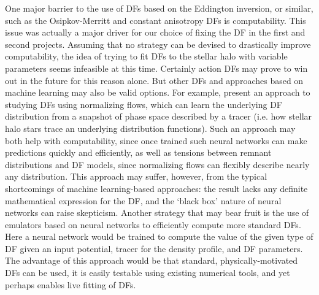 One major barrier to the use of DFs based on the Eddington inversion, or similar, such as the Osipkov-Merritt and constant anisotropy DFs is computability. This issue was actually a major driver for our choice of fixing the DF in the first and second projects. Assuming that no strategy can be devised to drastically improve computability, the idea of trying to fit DFs to the stellar halo with variable parameters seems infeasible at this time. Certainly action DFs may prove to win out in the future for this reason alone. But other DFs and approaches based on machine learning may also be valid options. For example, \textcite{green23} present an approach to studying DFs using normalizing flows, which can learn the underlying DF distribution from a snapshot of phase space described by a tracer (i.e. how stellar halo stars trace an underlying distribution functions). Such an approach may both help with computability, since once trained such neural networks can make predictions quickly and efficiently, as well as tensions between remnant distributions and DF models, since normalizing flows can flexibly describe nearly any distribution. This approach may suffer, however, from the typical shortcomings of machine learning-based approaches: the result lacks any definite mathematical expression for the DF, and the `black box' nature of neural networks can raise skepticism. Another strategy that may bear fruit is the use of emulators based on neural networks to efficiently compute more standard DFs. Here a neural network would be trained to compute the value of the given type of DF given an input potential, tracer for the density profile, and DF parameters. The advantage of this approach would be that standard, physically-motivated DFs can be used, it is easily testable using existing numerical tools, and yet perhaps enables live fitting of DFs.